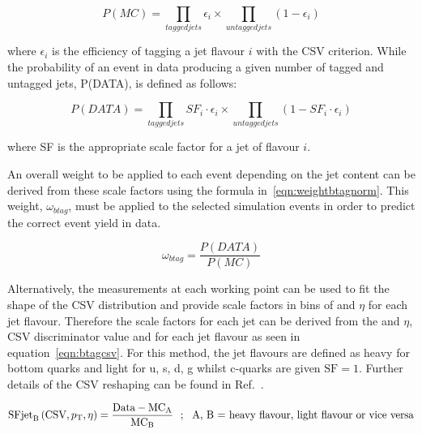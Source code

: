 \begin{centering}
\begin{equation}
P(MC) = \prod_{tagged jets}\epsilon_{i} \times \prod_{untagged jets}(1- \epsilon_{i})
\end{equation}
\end{centering}
where $\epsilon_{i}$ is the efficiency of tagging a jet flavour $i$ with the CSV criterion. While the probability of an event in data producing a given number of tagged and untagged jets, P(DATA), is defined as follows:


\begin{centering}
\begin{equation}
P(DATA) = \prod_{tagged jets}SF_{i}\cdot\epsilon_{i} \times \prod_{untagged jets}(1- SF_{i}\cdot\epsilon_{i})
\end{equation}
\end{centering}
where SF is the appropriate scale factor for a jet of flavour $i$. 

An overall weight to be applied to each event depending on the jet content can be derived from these scale factors using the formula in~\ref{eqn:weightbtagnorm}. This weight, $\omega_{btag}$, must be applied to the selected simulation events in order to predict the correct event yield in data.

\begin{centering}
\begin{equation}
 \omega_{btag} = \frac{P(DATA)}{P(MC)}
 \label{eqn:weightbtagnorm}
\end{equation}
\end{centering}


Alternatively, the measurements at each working point can be used to fit the shape of the CSV distribution and provide scale factors in bins of \pt and $\eta$ for each jet flavour. Therefore the scale factors for each jet can be derived from the \pt and $\eta$, CSV discriminator value and for each jet flavour as seen in equation~\ref{eqn:btagcsv}. For this method, the jet flavours are defined as heavy for bottom quarks and light for u, s, d, g whilst c-quarks are given $\textrm{SF} = 1$. Further details of the CSV reshaping can be found in Ref.~\cite{CMS-NOTE-2013-130}.

\begin{equation}
\textrm{SFjet}_{\textrm{B}} \left(\textrm{CSV},p_{\mathrm{T}},\eta \right) = \frac{\textrm{Data} - \textrm{MC}_{\textrm{A}}}{\textrm{MC}_{\textrm{B}}} ~~;~~ \textrm{A, B = heavy flavour, light flavour or vice versa}
\label{eqn:btagcsv}
\end{equation}

